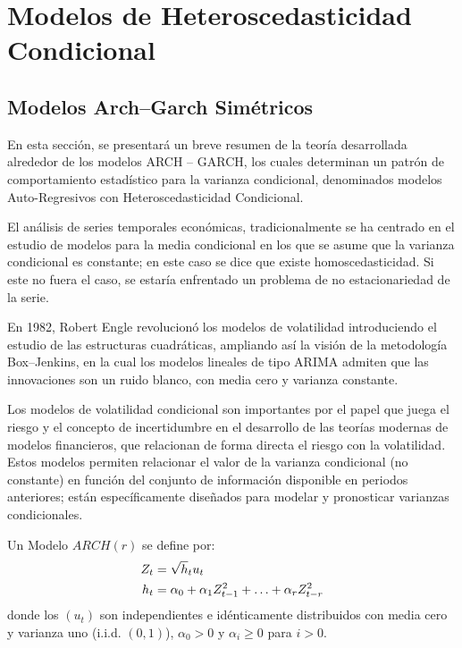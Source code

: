 \chapter{Modelos de Heteroscedasticidad Condicional}

\section{Modelos Arch--Garch Sim\'{e}tricos}

En esta secci\'{o}n, se presentar\'{a} un breve resumen de la teor\'{i}a 
desarrollada alrededor de los modelos ARCH -- 
GARCH, los cuales determinan un patr\'{o}n de comportamiento 
estad\'{i}stico para la varianza condicional, denominados modelos 
Auto-Regresivos con Heteroscedasticidad Condicional. 

El an\'{a}lisis de series temporales econ\'{o}micas, tradicionalmente se ha 
centrado en el estudio de modelos para la media condicional en los que se 
asume que la varianza condicional es constante; en este caso se dice que 
existe homoscedasticidad. Si este no fuera el caso, se estar\'{i}a 
enfrentado un problema de no estacionariedad de la serie.

En 1982, Robert Engle revolucion\'{o} los modelos de volatilidad 
introduciendo el estudio de las estructuras cuadr\'{a}ticas, ampliando 
as\'{i} la visi\'{o}n de la metodolog\'{i}a Box--Jenkins, en la cual los 
modelos lineales de tipo ARIMA admiten que las innovaciones son un ruido 
blanco, con media cero y varianza constante.

Los modelos de volatilidad condicional son importantes por el papel que 
juega el riesgo y el concepto de incertidumbre en el desarrollo de las 
teor\'{i}as modernas de modelos financieros, que relacionan de forma 
directa el riesgo con la volatilidad. Estos modelos permiten relacionar el 
valor de la varianza condicional (no constante) en funci\'{o}n del conjunto 
de informaci\'{o}n disponible en periodos anteriores; est\'{a}n 
espec\'{i}ficamente dise\~{n}ados para modelar y pronosticar varianzas 
condicionales.

\begin{definicion}
 Un Modelo $ARCH(r)$ se define por:
\begin{align*}
 Z_{t}&=\sqrt h_{t} u_{t} \\ 
 h_{t}&=\alpha_{0}+\alpha_{1}Z_{t-1}^{2}+\mathellipsis +\alpha 
_{r}Z_{t-r}^{2}
\end{align*}
donde los $(u_{t})$ son independientes e id\'{e}nticamente distribuidos con 
media cero y varianza uno (i.i.d. $(0,1)$), $\alpha_{0}>0$ y $\alpha_{i}\ge 0$ para $i>0$.
\end{definicion}


